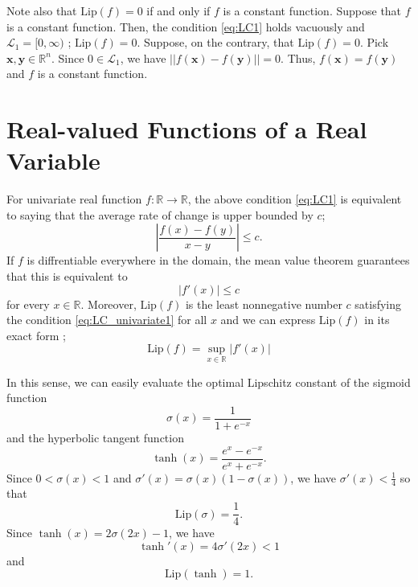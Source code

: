 \documentclass[12pt]{report}
\numberwithin{figure}{chapter}
\theoremstyle{plain}
\theoremstyle{definition}
\theoremstyle{corollary}
\theoremstyle{definition}
\theoremstyle{plain}
\theoremstyle{definition}
\theoremstyle{plain}
\newcommand\bx{\ensuremath{\boldsymbol x}}
\newcommand\by{\ensuremath{\boldsymbol y}}
\newcommand\lip{\ensuremath{\text{Lip}}}
\begin{document}
Note also that \(\lip(f)=0\) if and only if \(f\) is a constant function.
Suppose that \(f\) is a constant function.
Then, the condition \eqref{eq:LC1} holds vacuously and \(\mathcal L_1=[0,\infty)\) ; \(\lip(f)=0\).
Suppose, on the contrary, that \(\lip(f)=0\).
Pick \(\bx,\by\in\mathbb R^n\).
Since \(0\in\mathcal L_1\), we have \(||f(\bx)-f(\by)||=0\).
Thus, \(f(\bx)=f(\by)\) and \(f\) is a constant function.

\section{Real-valued Functions of a Real Variable}

For univariate real function \(f:\mathbb R\to\mathbb R\), the above condition \eqref{eq:LC1} is equivalent to saying that the average rate of change is upper bounded by \(c\);
\begin{equation}\label{eq:LC_average_rate_of_change}
\left|\frac{f(x)-f(y)}{x-y}\right|\le c.
\end{equation}
If \(f\) is diffrentiable everywhere in the domain, the mean value theorem guarantees that this is equivalent to 
\begin{equation}\label{eq:LC_univariate1}
|f'(x)|\le c
\end{equation}
for every \(x\in\mathbb R\).
Moreover, \(\lip(f)\) is the least nonnegative number \(c\) satisfying the condition \eqref{eq:LC_univariate1} for all \(x\) and we can express \(\lip(f)\) in its exact form ; 
\begin{equation}\label{eq:LC_univariate2}
\lip (f) = \sup_{x\in\mathbb R}|f'(x)|
\end{equation}

In this sense, we can easily evaluate the optimal Lipschitz constant of the sigmoid function
\begin{equation}\label{eq:sigmoid}
\sigma(x)=\frac1{1+e^{-x}}
\end{equation}
and the hyperbolic tangent function
\begin{equation}\label{eq:tanh}
\tanh(x)=\frac{e^x-e^{-x}}{e^x+e^{-x}}.
\end{equation}
Since \(0<\sigma(x)<1\) and \(\sigma'(x)=\sigma(x)\left(1-\sigma(x)\right)\), we have \(\sigma'(x)<\frac14\) so that
\begin{equation}\label{eq:sigmoid_LC}
\lip(\sigma)=\frac14.
\end{equation}
Since \(\tanh(x)=2\sigma(2x)-1\), we have
\[\tanh'(x)=4\sigma'(2x)<1\]
and
\begin{equation}\label{eq:tanh_LC}
\lip(\tanh)=1.
\end{equation}
\end{document}
